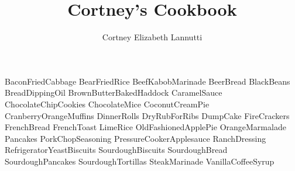 \documentclass[a4paper, titlepage]{book}
\title{Cortney's Cookbook}
\author{Cortney Elizabeth Lannutti}
\date{}
\begin{document}
\maketitle
{}
\tableofcontents
\newpage
{}

{BaconFriedCabbage}
{BearFriedRice}
{BeefKabobMarinade}
{BeerBread}
{BlackBeans}
{BreadDippingOil}
{BrownButterBakedHaddock}
{CaramelSauce}
{ChocolateChipCookies}
{ChocolateMice}
{CoconutCreamPie}
{CranberryOrangeMuffins}
{DinnerRolls}
{DryRubForRibs}
{DumpCake}
{FireCrackers}
{FrenchBread}
{FrenchToast}
{LimeRice}
{OldFashionedApplePie}
{OrangeMarmalade}
{Pancakes}
{PorkChopSeasoning}
{PressureCookerApplesauce}
{RanchDressing}
{RefrigeratorYeastBiscuits}
{SourdoughBiscuits}
{SourdoughBread}
{SourdoughPancakes}
{SourdoughTortillas}
{SteakMarinade}
{VanillaCoffeeSyrup}
\end{document}
